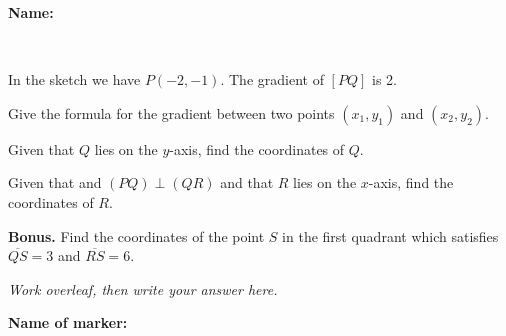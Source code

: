 \documentclass[9pt]{exam}
\begin{document}
\sffamily

\textbf{Name:} \dotfill

\


In the sketch we have $P(-2,-1)$. The gradient of $[PQ]$ is 2. 
\vspace{-3mm}
\begin{center}
\end{center}

\begin{questions}
\question[1] Give the formula for the gradient between two points $(x_1, y_1)$ and $(x_2, y_2)$.
\fillwithdottedlines{21mm}

\question[3] Given that $Q$ lies on the $y$-axis, find the coordinates of $Q$.
\fillwithdottedlines{21mm}



\question[4] Given that  and $(PQ) \perp (QR)$ and that $R$ lies on the $x$-axis, find the coordinates of $R$.

\question \textbf{Bonus.} Find the coordinates of the point $S$ in the first quadrant which satisfies $\overline{QS} = 3$ and $\overline{RS} = 6$.

\emph{Work overleaf, then write your answer here.}
\fillwithdottedlines{10mm}

\end{questions}

\begin{tcolorbox}

\textbf{Name of marker:}

\begin{center}
\gradetable[h][questions]
\end{center}

\end{tcolorbox}
\end{document}
